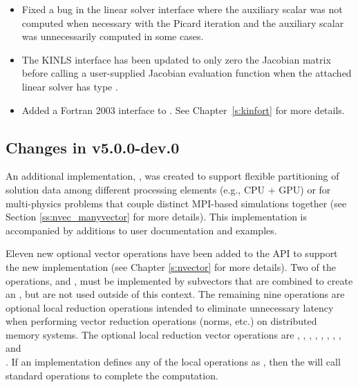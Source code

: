 \begin{itemize}
\item Fixed a bug in the {\kinsol} linear solver interface where the auxiliary scalar
 was not computed when necessary with the Picard iteration and the
auxiliary scalar  was unnecessarily computed in some cases.
%
\item The KINLS interface has been updated to only zero the Jacobian matrix before
calling a user-supplied Jacobian evaluation function when the attached linear
solver has type \newline\noindent
{}.
%
\item Added a Fortran 2003 interface to {\kinsol}. See Chapter~\ref{s:kinfort}
for more details.
\end{itemize}


\subsection*{Changes in v5.0.0-dev.0}

An additional {\nvector} implementation, {\nvecmanyvector}, was
created to support flexible partitioning of solution data among
different processing elements (e.g., CPU + GPU) or for multi-physics
problems that couple distinct MPI-based simulations together (see
Section \ref{ss:nvec_manyvector} for more details).  This
implementation is accompanied by additions to user documentation and
{\sundials} examples.

Eleven new optional vector operations have been added to the {\nvector} API to
support the new {\nvecmanyvector} implementation (see Chapter \ref{s:nvector}
for more details). Two of the operations,  and
, must be implemented by subvectors that are combined to
create an {\nvecmanyvector}, but are not used outside of this context. The
remaining nine operations are optional local reduction operations intended to
eliminate unnecessary latency when performing vector reduction operations
(norms, etc.) on distributed memory systems. The optional local reduction vector
operations are
,
,
,
,
,
,
,
, and\\
.
If an {\nvector} implementation defines any of the local operations as
, then the {\nvecmanyvector} will call standard {\nvector} operations
to complete the computation.


